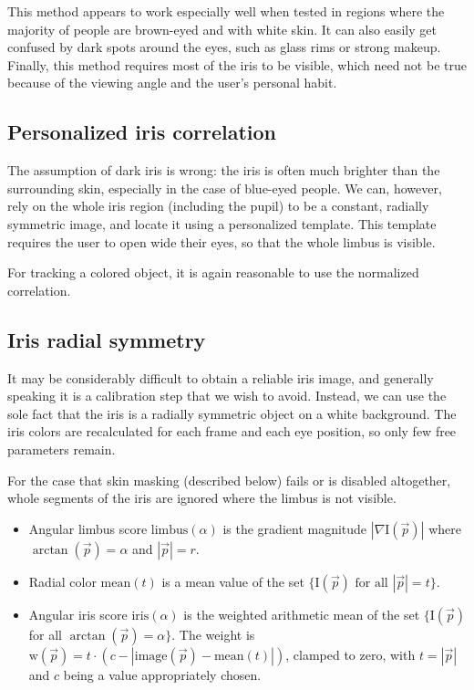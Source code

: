 This method appears to work especially well when tested in regions where the majority of people are brown-eyed and with white skin.
It can also easily get confused by dark spots around the eyes, such as glass rims or strong makeup.
Finally, this method requires most of the iris to be visible, which need not be true because of the viewing angle and the user's personal habit.

\subsection{Personalized iris correlation}
The assumption of dark iris is wrong: the iris is often much brighter than the surrounding skin, especially in the case of blue-eyed people.
We can, however, rely on the whole iris region (including the pupil) to be a constant, radially symmetric image, and locate it using a personalized template.
This template requires the user to open wide their eyes, so that the whole limbus is visible.

For tracking a colored object, it is again reasonable to use the normalized correlation.


\subsection{Iris radial symmetry}

It may be considerably difficult to obtain a reliable iris image, and generally speaking it is a calibration step that we wish to avoid.
Instead, we can use the sole fact that the iris is a radially symmetric object on a white background.
The iris colors are recalculated for each frame and each eye position, so only few free parameters remain.

For the case that skin masking (described below) fails or is disabled altogether, whole segments of the iris are ignored where the limbus is not visible.

\begin{itemize}
\item
Angular limbus score $\textrm{limbus}(\alpha)$ is the gradient magnitude $|\nabla \textrm{I}(\vec p)|$ where $\arctan(\vec p) = \alpha$ and $|\vec p| = r$.

\item
Radial color $\textrm{mean}(t)$ is a mean value of the set $\{\textrm{I}(\vec p) \text{ for all } |\vec p| = t \}$.

\item
Angular iris score $\textrm{iris}(\alpha)$ is the weighted arithmetic mean of the set $\{\textrm{I}(\vec p)$ for all $\arctan(\vec p) = \alpha \}$.
The weight is $\textrm{w}(\vec p) = t \cdot (c - |\textrm{image}(\vec p) - \textrm{mean}(t)|)$, clamped to zero, with $t = |\vec p|$ and $c$ being a value appropriately chosen.

\end{itemize}

